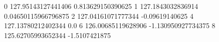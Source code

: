 0 127.95143127441406 0.813629150390625
1 127.1843032836914 0.04650115966796875
2 127.04161071777344 -0.09619140625
4 127.13780212402344 0.0
6 126.00685119628906 -1.130950927734375
8 125.62705993652344 -1.5107421875
